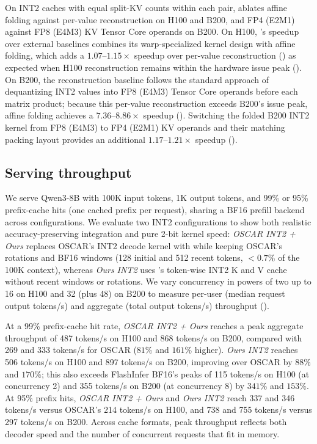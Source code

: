 On INT2 caches with equal split-KV counts within each pair,  ablates affine folding against per-value reconstruction on H100 and B200, and FP4 (E2M1) against FP8 (E4M3) KV Tensor Core operands on B200.
On H100, \sys{}'s speedup over external baselines combines its warp-specialized kernel design with affine folding, which adds a $1.07$--$1.15\times$ speedup over per-value reconstruction () as expected when H100 reconstruction remains within the hardware issue peak ().
On B200, the reconstruction baseline follows the standard approach of dequantizing INT2 values into FP8 (E4M3) Tensor Core operands before each matrix product; because this per-value reconstruction exceeds B200's issue peak, affine folding achieves a $7.36$--$8.86\times$ speedup ().
Switching the folded B200 INT2 kernel from FP8 (E4M3) to FP4 (E2M1) KV operands and their matching packing layout provides an additional $1.17$--$1.21\times$ speedup ().

\subsection{Serving throughput}
\label{sec:eval-serving-throughput}



We serve Qwen3-8B with 100K input tokens, 1K output tokens, and 99\% or 95\% prefix-cache hits (one cached prefix per request), sharing a BF16 prefill backend across configurations.
We evaluate two INT2 configurations to show both realistic accuracy-preserving integration and pure 2-bit kernel speed: \emph{OSCAR INT2 + Ours} replaces OSCAR's INT2 decode kernel with \sys{} while keeping OSCAR's rotations and BF16 windows (128 initial and 512 recent tokens, $<0.7\%$ of the 100K context), whereas \emph{Ours INT2} uses \sys{}'s token-wise INT2 K and V cache without recent windows or rotations.
We vary concurrency in powers of two up to 16 on H100 and 32 (plus 48) on B200 to measure per-user (median request output tokens/s) and aggregate (total output tokens/s) throughput ().

At a 99\% prefix-cache hit rate, \emph{OSCAR INT2 + Ours} reaches a peak aggregate throughput of 487 tokens/s on H100 and 868 tokens/s on B200, compared with 269 and 333 tokens/s for OSCAR ($81\%$ and $161\%$ higher).
\emph{Ours INT2} reaches 506 tokens/s on H100 and 897 tokens/s on B200, improving over OSCAR by $88\%$ and $170\%$; this also exceeds FlashInfer BF16's peaks of 115 tokens/s on H100 (at concurrency 2) and 355 tokens/s on B200 (at concurrency 8) by $341\%$ and $153\%$.
At 95\% prefix hits, \emph{OSCAR INT2 + Ours} and \emph{Ours INT2} reach 337 and 346 tokens/s versus OSCAR's 214 tokens/s on H100, and 738 and 755 tokens/s versus 297 tokens/s on B200.
Across cache formats, peak throughput reflects both decoder speed and the number of concurrent requests that fit in memory.

